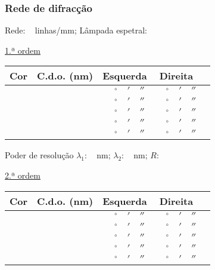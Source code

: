 \documentclass[a4paper,12pt]{article}  %
\begin{document}
\vspace{0.5 cm}
\subsubsection{\sf Rede de difracção}

Rede: ~\underline{\makebox[1cm][r]{~}} linhas/mm;
Lâmpada espetral: ~\underline{\makebox[3cm][r]{~}}

\vspace{1 cm}
\underline{1.ª ordem}

\begin{center}
	\begin{tabular}{|c|c|c|c|c}
	\hline
	 Cor &
	 C.d.o. (nm) &
	 Esquerda    &  
	 Direita  \\
	\hline \hline
	  \makebox[3cm][r]{} & & $\quad^{\circ}\quad'\quad''$ & $\quad^{\circ}\quad'\quad''$ \\ \cline{1-3}
	 & & $\quad^{\circ}\quad'\quad''$ & $\quad^{\circ}\quad'\quad''$ \\ \cline{1-3}
	 & & $\quad^{\circ}\quad'\quad''$ & $\quad^{\circ}\quad'\quad''$ \\ \cline{1-3}
	 & & $\quad^{\circ}\quad'\quad''$ & $\quad^{\circ}\quad'\quad''$ \\ \cline{1-3}
	 & & $\quad^{\circ}\quad'\quad''$ & $\quad^{\circ}\quad'\quad''$ \\ \hline
	\end{tabular}
\end{center}

Poder de resolução
$\lambda_1$: ~\underline{\makebox[1cm][r]{~}} nm; $\lambda_2$: ~\underline{\makebox[1cm][r]{~}} nm; $R$: ~\underline{\makebox[1.5cm][r]{~}}

\vspace{1 cm}
\underline{2.ª ordem}

\begin{center}
	\begin{tabular}{|c|c|c|c|c}
	\hline
	 Cor &
	 C.d.o. (nm) &
	 Esquerda    &  
	 Direita  \\
	\hline \hline
	  \makebox[3cm][r]{} & & $\quad^{\circ}\quad'\quad''$ & $\quad^{\circ}\quad'\quad''$ \\ \cline{1-3}
	 & & $\quad^{\circ}\quad'\quad''$ & $\quad^{\circ}\quad'\quad''$ \\ \cline{1-3}
	 & & $\quad^{\circ}\quad'\quad''$ & $\quad^{\circ}\quad'\quad''$ \\ \cline{1-3}
	 & & $\quad^{\circ}\quad'\quad''$ & $\quad^{\circ}\quad'\quad''$ \\ \cline{1-3}
	 & & $\quad^{\circ}\quad'\quad''$ & $\quad^{\circ}\quad'\quad''$ \\ \hline
	\end{tabular}
\end{center}
\end{document}
